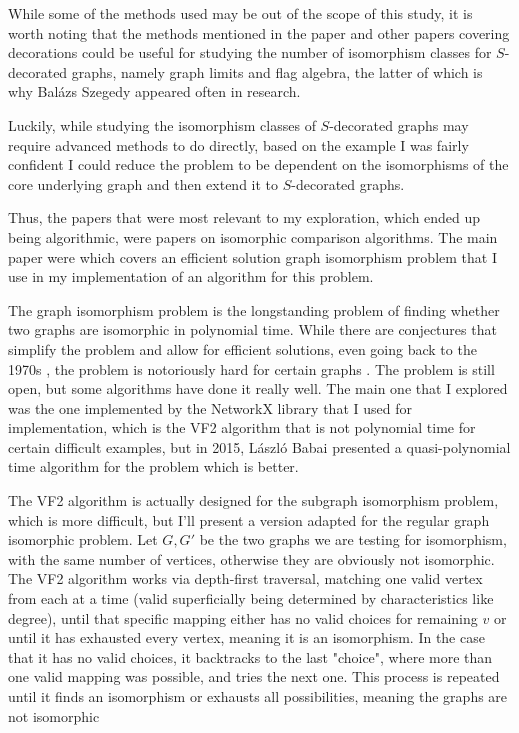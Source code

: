 \documentclass[11pt,reqno]{amsart}
\theoremstyle{definition}
\begin{document}
While some of the methods used may be out of the scope of this study, it is worth noting that the methods mentioned in the paper and other papers covering decorations could be useful for studying the number of isomorphism classes for $S$-decorated graphs, namely graph limits and flag algebra, the latter of which is why Balázs Szegedy appeared often in research. 

Luckily, while studying the isomorphism classes of $S$-decorated graphs may require advanced methods to do directly, based on the example I was fairly confident I could reduce the problem to be dependent on the isomorphisms of the core underlying graph and then extend it to $S$-decorated graphs.

Thus, the papers that were most relevant to my exploration, which ended up being algorithmic, were papers on isomorphic comparison algorithms. The main paper were \cite{inproceedings} which covers an efficient solution graph isomorphism problem that I use in my implementation of an algorithm for this problem. 

The graph isomorphism problem is the longstanding problem of finding whether two graphs are isomorphic in polynomial time. While there are conjectures that simplify the problem and allow for efficient solutions, even going back to the 1970s \cite{corneil1970efficient}, the problem is notoriously hard for certain graphs \cite{fortin1996graph}. The problem is still open, but some algorithms have done it really well. The main one that I explored was the one implemented by the NetworkX library that I used for implementation, which is the VF2 algorithm that is not polynomial time for certain difficult examples, but in 2015, László Babai presented a quasi-polynomial time algorithm for the problem which is better.

The VF2 algorithm is actually designed for the subgraph isomorphism problem, which is more difficult, but I'll present a version adapted for the regular graph isomorphic problem. Let $G, G'$ be the two graphs we are testing for isomorphism, with the same number of vertices, otherwise they are obviously not isomorphic. The VF2 algorithm works via depth-first traversal, matching one valid vertex from each at a time (valid superficially being determined by characteristics like degree), until that specific mapping either has no valid choices for remaining $v$ or until it has exhausted every vertex, meaning it is an isomorphism. In the case that it has no valid choices, it backtracks to the last "choice", where more than one valid mapping was possible, and tries the next one. This process is repeated until it finds an isomorphism or exhausts all possibilities, meaning the graphs are not isomorphic \cite{inproceedings}
\end{document}
